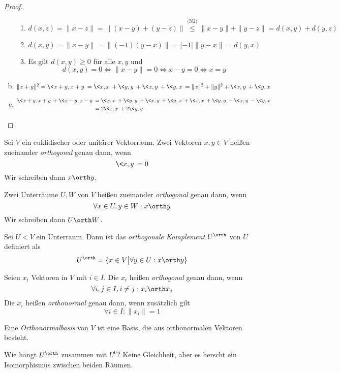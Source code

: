 \documentclass[a4paper, 10pt]{scrbook}
\begin{document}
\begin{thm}
\begin{proof}
\begin{enumerate}[(a)]
				\begin{enumerate}[({M}1)]
					\item
						$
							d(x,z) = \|x-z\| = \|(x-y)+(y-z)\| \stackrel{\text{(N2)}}\le \|x-y\| + \|y-z\| = d(x,y) + d(y,z)
						$
					\item
						$
							d(x,y) = \|x-y\| = \|(-1)(y-x)\| = |-1|\|y-x\| = d(y,x)
						$
					\item
						Es gilt $d(x,y) \ge 0$ für alle $x,y$ und
						\[
							d(x,y) = 0 \iff \|x-y\| = 0 \iff x-y = 0 \iff x=y
						\]
				\end{enumerate}
			\item
				$
					\|x+y\|^2 = \<x+y,x+y\> = \<x,x\> + \<y,y\> + \<x,y\> + \<y,x\> = \|x\|^2 + \|y\|^2 + \<x,y\> + \<y,x\>
				$				
			\item
				\begin{align*}
					\<x+y,x+y\> + \<x-y,x-y\> &= \<x,x\> + \<y,y\> + \<x,y\> + \<y,x\> + \<x,x\> + \<y,y\> - \<x,y\> -\<y,x\>\\
											  &= 2\<x,x\> + 2\<y,y\>
				\end{align*}
		\end{enumerate}
	\end{proof}
\end{thm}

\begin{df}[Orthogonalität]
	\label{df:13.7}
	Sei $V$ ein euklidischer oder unitärer Vektorraum.
	Zwei Vektoren $x,y\in V$ heißen zueinander \emph{orthogonal} genau dann, wenn
	\[
		\<x,y\> = 0
	\]
	Wir schreiben dann $x \orth y$.

	Zwei Unterräume $U,W$ von $V$ heißen zueinander \emph{orthogonal} genau dann, wenn
	\[
		\forall x\in U, y\in W : x \orth y
	\]
	Wir schreiben dann $U \orth W$.

	Sei $U<V$ ein Unterraum.
	Dann ist das \emph{orthogonale Komplement} $U^\orth$ von $U$ definiert als
	\[
		U^\orth = \{ x\in V \big| \forall y\in U: x\orth y\}
	\]

	Seien $x_i$ Vektoren in $V$ mit $i\in I$.
	Die $x_i$ heißen \emph{orthogonal} genau dann, wenn
	\[
		\forall i,j\in I, i\neq j : x_i \orth x_j
	\]
	Die $x_i$ heißen \emph{orthonormal} genau dann, wenn zusätzlich gilt
	\[
		\forall i\in I: \|x_i\| = 1
	\]

	Eine \emph{Orthonormalbasis} von $V$ ist eine Basis, die aus orthonormalen Vektoren besteht.
\end{df}

\begin{note}
	Wie hängt $U^\orth$ zusammen mit $U^0$?
	Keine Gleichheit, aber es herscht ein Isomorphismus zwischen beiden Räumen.
\end{note}
\end{document}
